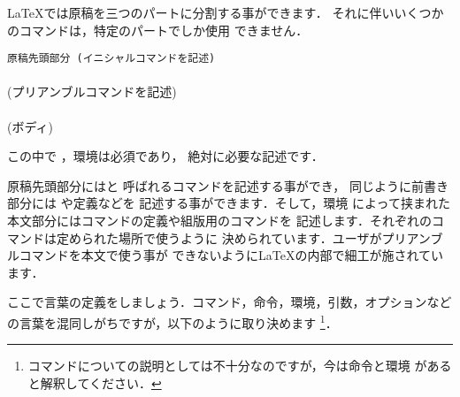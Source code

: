 {{{{{%
%
{\LaTeX}では原稿を三つのパートに分割する事ができます．
それに伴いいくつかのコマンドは，特定のパートでしか使用
できません．
\begin{Syntax}
\verb|原稿先頭部分 (イニシャルコマンドを記述)|\\
%
	\\
 (プリアンブルコマンドを記述)\\
\verb||\\
 (ボディ)\\
\verb||
\end{Syntax}
この中で ，環境は必須であり，
絶対に必要な記述です．

%
%
原稿先頭部分にはと
呼ばれるコマンドを記述する事ができ，
同じように前書き部分には%
や定義などを
記述する事ができます．そして，環境
によって挟まれた本文部分にはコマンドの定義や組版用のコマンドを
記述します．それぞれのコマンドは定められた場所で使うように
決められています．ユーザがプリアンブルコマンドを本文で使う事が
できないように{\LaTeX}の内部で細工が施されています．

ここで言葉の定義をしましょう．コマンド，命令，環境，引数，オプションなど
の言葉を混同しがちですが，以下のように取り決めます
\footnote{コマンドについての説明としては不十分なのですが，今は命令と環境
があると解釈してください．}．

}}}}}
